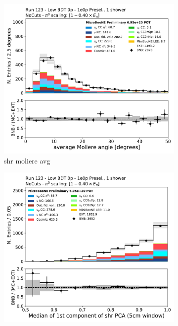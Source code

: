 \begin{figure}[H]
    \centering
    \begin{subfigure}{0.3\textwidth}
    \includegraphics[width=1.0\textwidth]{1e0p/Low_BDT_Sideband/shrmoliereavg.pdf}
    \caption{shr moliere avg}
    \end{subfigure}
    \begin{subfigure}{0.3\textwidth}
    \includegraphics[width=1.0\textwidth]{1e0p/Low_BDT_Sideband/shrPCA1CMed_5cm.pdf}

\end{subfigure}
\end{figure}

